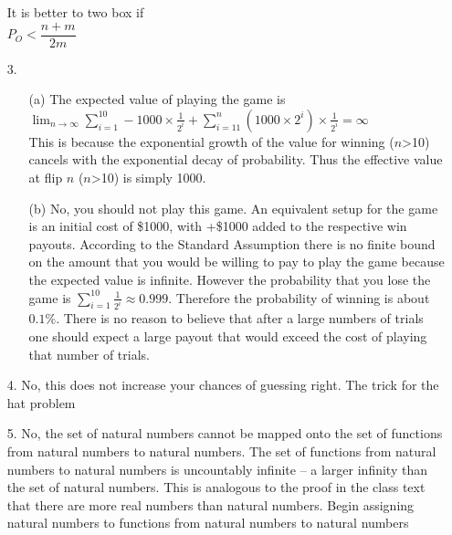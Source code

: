\documentclass{article}
\begin{document}
\begin{enumerate}
	It is better to two box if \\
	
	$P_O < \dfrac{n+m}{2m}$\\

\newpage

\item[3.]
	\begin{enumerate}
	\item[(a)]
		The expected value of playing the game is \\
		
		$\displaystyle \lim_{n \to \infty} \sum_{i=1}^{10}-1000 \times \frac{1}{2^{i}} + \sum_{i=11}^{n} (1000 \times 2^{i}) \times \frac{1}{2^{i}} = \infty$\\
		
		This is because the exponential growth of the value for winning ($n$>10) cancels with the exponential decay of probability. Thus the effective value at flip $n$ ($n$>10) is simply 1000.

	\item[(b)]
		No, you should not play this game. An equivalent setup for the game is an initial cost of \$1000, with +\$1000 added to the respective win payouts. According to the Standard Assumption there is no finite bound on the amount that you would be willing to pay to play the game because the expected value is infinite. However the probability that you lose the game is $\displaystyle\sum_{i=1}^{10} \frac{1}{2^{i}} \approx 0.999$. Therefore the probability of winning is about $0.1\%$. There is no reason to believe that after a large numbers of trials one should expect a large payout that would exceed the cost of playing that number of trials.
	\end{enumerate}

\newpage

\item[4.]
	No, this does not increase your chances of guessing right. The trick for the hat problem 

\newpage

\item[5.]
No, the set of natural numbers cannot be mapped onto the set of functions from natural numbers to natural numbers. The set of functions from natural numbers to natural numbers is uncountably infinite -- a larger infinity than the set of natural numbers. This is analogous to the proof in the class text that there are more real numbers than natural numbers. Begin assigning natural numbers to functions from natural numbers to natural numbers\\


\end{enumerate}
\end{document}
